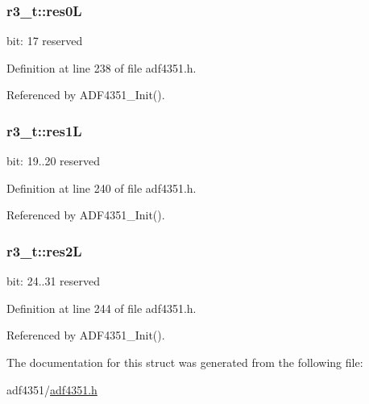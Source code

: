 \subsubsection[{\texorpdfstring{res0L}{res0L}}]{ r3\+\_\+t\+::res0L}\hypertarget{structr3__t_aa10065b1b2c2aed70a9e4427e76db29a}{}\label{structr3__t_aa10065b1b2c2aed70a9e4427e76db29a}
bit\+: 17 reserved 

Definition at line 238 of file adf4351.\+h.



Referenced by A\+D\+F4351\+\_\+\+Init().

\subsubsection[{\texorpdfstring{res1L}{res1L}}]{ r3\+\_\+t\+::res1L}\hypertarget{structr3__t_ab655f5b258ae1446791fbe557680daa6}{}\label{structr3__t_ab655f5b258ae1446791fbe557680daa6}
bit\+: 19..20 reserved 

Definition at line 240 of file adf4351.\+h.



Referenced by A\+D\+F4351\+\_\+\+Init().

\subsubsection[{\texorpdfstring{res2L}{res2L}}]{ r3\+\_\+t\+::res2L}\hypertarget{structr3__t_a2a1f40b19f451868336ca6558f653f1d}{}\label{structr3__t_a2a1f40b19f451868336ca6558f653f1d}
bit\+: 24..31 reserved 

Definition at line 244 of file adf4351.\+h.



Referenced by A\+D\+F4351\+\_\+\+Init().



The documentation for this struct was generated from the following file\+:\begin{DoxyCompactItemize}
\item 
adf4351/\hyperlink{adf4351_8h}{adf4351.\+h}\end{DoxyCompactItemize}
